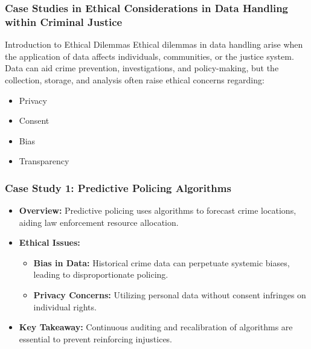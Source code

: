 \documentclass[aspectratio=169]{beamer}
\begin{document}
\begin{frame}[fragile]
    \frametitle{Case Studies in Ethical Considerations in Data Handling within Criminal Justice}
    \begin{block}{Introduction to Ethical Dilemmas}
        Ethical dilemmas in data handling arise when the application of data affects individuals, communities, or the justice system. Data can aid crime prevention, investigations, and policy-making, but the collection, storage, and analysis often raise ethical concerns regarding:
        \begin{itemize}
            \item Privacy
            \item Consent
            \item Bias
            \item Transparency
        \end{itemize}
    \end{block}
\end{frame}

\begin{frame}[fragile]
    \frametitle{Case Study 1: Predictive Policing Algorithms}
    \begin{itemize}
        \item \textbf{Overview:} Predictive policing uses algorithms to forecast crime locations, aiding law enforcement resource allocation.
        \item \textbf{Ethical Issues:}
        \begin{itemize}
            \item \textbf{Bias in Data:} Historical crime data can perpetuate systemic biases, leading to disproportionate policing.
            \item \textbf{Privacy Concerns:} Utilizing personal data without consent infringes on individual rights.
        \end{itemize}
        \item \textbf{Key Takeaway:} Continuous auditing and recalibration of algorithms are essential to prevent reinforcing injustices.
    \end{itemize}
\end{frame}
\end{document}
